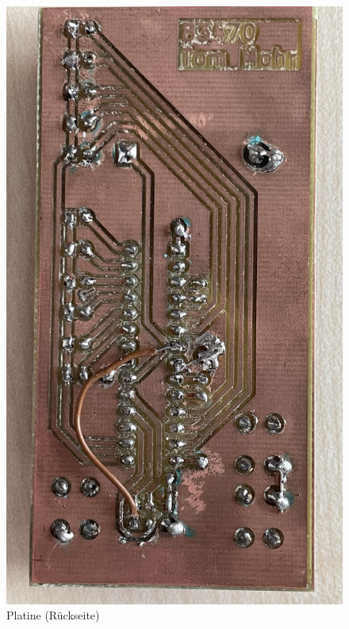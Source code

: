 		\begin{figure}[H]
			\centering
			\includegraphics[height=0.8\textheight]{platine_bottom}
			\caption{Platine (Rückseite)}
			\label{fig:product-bottom}
		\end{figure}

